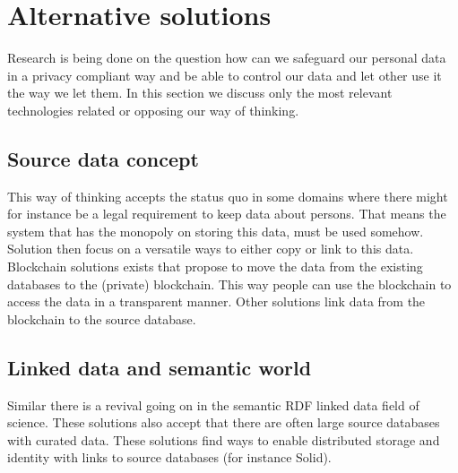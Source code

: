 \documentclass{article}
\begin{document}


\section{Alternative solutions}
%
Research is being done on the question how can we safeguard our personal data in a privacy compliant way and be able to control our data and let other use it the way we let them. In this section we discuss only the most relevant technologies related or opposing our way of thinking.

\subsection{Source data concept}
This way of thinking accepts the status quo in some domains where there might for instance be a legal requirement to keep data about persons. That means the system that has the monopoly on storing this data, must be used somehow. Solution then focus on a versatile ways to either copy or link to this data. Blockchain solutions exists that propose to move the data from the existing databases to the (private) blockchain. This way people can use the blockchain to access the data in a transparent manner. Other solutions link data from the blockchain to the source database.

\subsection{Linked data and semantic world}
Similar there is a revival going on in the semantic RDF linked data field of science. These solutions also accept that there are often large source databases with curated data. These solutions find ways to enable distributed storage and identity with links to source databases (for instance Solid).
\end{document}
